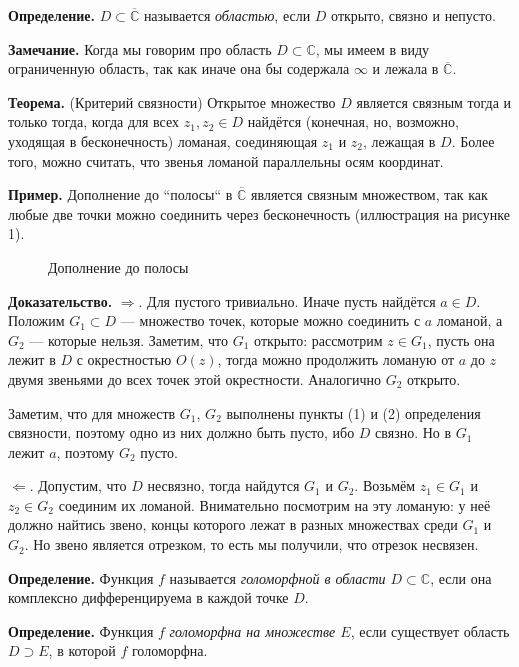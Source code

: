 \QED

\textbf{Определение.} $D \subset \overline {\mathbb C}$ называется \textit{областью}, если $D$ открыто, связно и непусто.

\textbf{Замечание.} Когда мы говорим про область $D \subset \mathbb C$, мы имеем в виду ограниченную область, так как иначе она бы содержала $\infty$ и лежала в $\overline {\mathbb C}$.

\textbf{Теорема.} (Критерий связности) Открытое множество $D$ является связным тогда и только тогда, когда для всех $z_1, z_2 \in D$ найдётся (конечная, но, возможно, уходящая в бесконечность) ломаная, соединяющая $z_1$ и $z_2$, лежащая в $D$.
Более того, можно считать, что звенья ломаной параллельны осям координат.

\textbf{Пример.} Дополнение до ``полосы`` в $\overline{\mathbb C}$ является связным множеством, так как любые две точки можно соединить через бесконечность (иллюстрация на рисунке 1).
\begin{figure}[ht]
    \centering
    \caption{Дополнение до полосы}
\end{figure}

\textbf{Доказательство.}
$\Rightarrow$. Для пустого тривиально. Иначе пусть найдётся $a \in D$.
Положим $G_1 \subset D$ --- множество точек, которые можно соединить с $a$ ломаной, а $G_2$ --- которые нельзя.
Заметим, что $G_1$ открыто: рассмотрим $z \in G_1$, пусть она лежит в $D$ с окрестностью $O(z)$, тогда можно продолжить ломаную от $a$ до $z$ двумя звеньями до всех точек этой окрестности.
Аналогично $G_2$ открыто.

Заметим, что для множеств $G_1$, $G_2$ выполнены пункты (1) и (2) определения связности, поэтому одно из них должно быть пусто, ибо $D$ связно.
Но в $G_1$ лежит $a$, поэтому $G_2$ пусто.

$\Leftarrow$. 
Допустим, что $D$ несвязно, тогда найдутся $G_1$ и $G_2$.
Возьмём $z_1 \in G_1$ и $z_2 \in G_2$ соединим их ломаной.
Внимательно посмотрим на эту ломаную: у неё должно найтись звено, концы которого лежат в разных множествах среди $G_1$ и $G_2$.
Но звено является отрезком, то есть мы получили, что отрезок несвязен.

\QED

\textbf{Определение.} Функция $f$ называется \textit{голоморфной в области $D \subset \mathbb C$}, если она комплексно дифференцируема в каждой точке $D$.

\textbf{Определение.} Функция $f$ \textit{голоморфна на множестве $E$}, если существует область $D \supset E$, в которой $f$ голоморфна.


